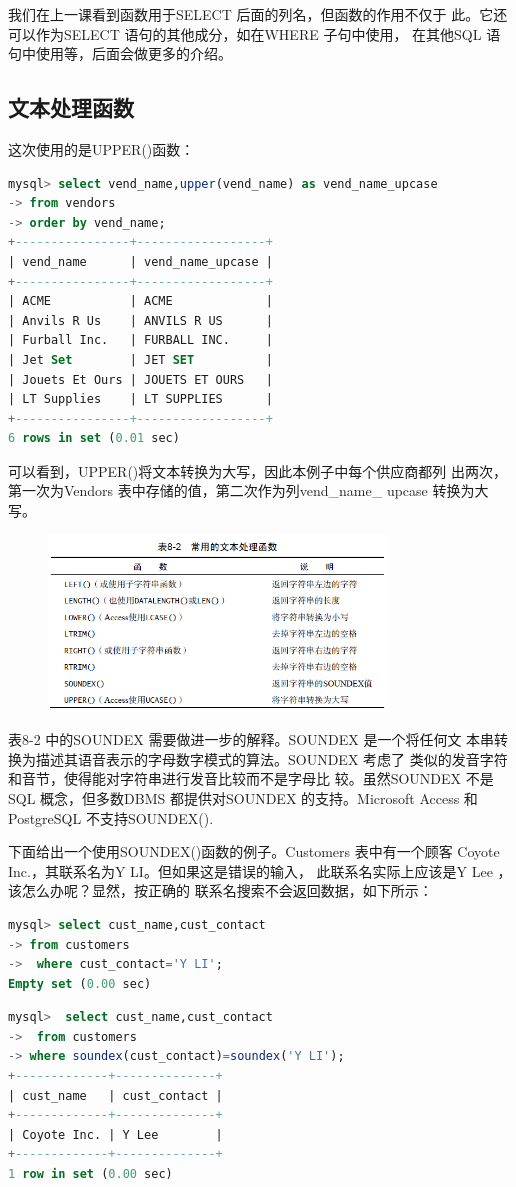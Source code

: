 \documentclass[11pt,a4paper,oneside]{book}
\begin{document}
我们在上一课看到函数用于SELECT 后面的列名，但函数的作用不仅于
此。它还可以作为SELECT 语句的其他成分，如在WHERE 子句中使用，
在其他SQL 语句中使用等，后面会做更多的介绍。

\subsection{文本处理函数}
这次使用的是UPPER()函数：
\begin{lstlisting}[language=sql]
mysql> select vend_name,upper(vend_name) as vend_name_upcase
-> from vendors
-> order by vend_name;
+----------------+------------------+
| vend_name      | vend_name_upcase |
+----------------+------------------+
| ACME           | ACME             |
| Anvils R Us    | ANVILS R US      |
| Furball Inc.   | FURBALL INC.     |
| Jet Set        | JET SET          |
| Jouets Et Ours | JOUETS ET OURS   |
| LT Supplies    | LT SUPPLIES      |
+----------------+------------------+
6 rows in set (0.01 sec)
\end{lstlisting}
可以看到，UPPER()将文本转换为大写，因此本例子中每个供应商都列
出两次，第一次为Vendors 表中存储的值，第二次作为列vend\_name\_
upcase 转换为大写。
\begin{figure}[H]
	\centering
	\includegraphics[width=0.8\textwidth]{5.png}
\end{figure}

表8-2 中的SOUNDEX 需要做进一步的解释。SOUNDEX 是一个将任何文
本串转换为描述其语音表示的字母数字模式的算法。SOUNDEX 考虑了
类似的发音字符和音节，使得能对字符串进行发音比较而不是字母比
较。虽然SOUNDEX 不是SQL 概念，但多数DBMS 都提供对SOUNDEX
的支持。Microsoft Access 和PostgreSQL 不支持SOUNDEX().

下面给出一个使用SOUNDEX()函数的例子。Customers 表中有一个顾客
Coyote Inc.，其联系名为Y LI。但如果这是错误的输入，
此联系名实际上应该是Y Lee ，该怎么办呢？显然，按正确的
联系名搜索不会返回数据，如下所示：
\begin{lstlisting}[language=sql]
mysql> select cust_name,cust_contact
-> from customers
->  where cust_contact='Y LI';
Empty set (0.00 sec)
\end{lstlisting}
\begin{lstlisting}[language=sql]
mysql>  select cust_name,cust_contact
->  from customers
-> where soundex(cust_contact)=soundex('Y LI');
+-------------+--------------+
| cust_name   | cust_contact |
+-------------+--------------+
| Coyote Inc. | Y Lee        |
+-------------+--------------+
1 row in set (0.00 sec)
\end{lstlisting}
\end{document}
